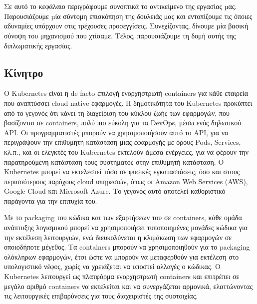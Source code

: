 \chapter{\grintroname} 
\label{chapter:gr-introduction}

Σε αυτό το κεφάλαιο περιγράφουμε συνοπτικά το αντικείμενο της εργασίας µας.
Παρουσιάζουμε µία σύντομη επισκόπηση της δουλειάς μας και εντοπίζουμε τις όποιες
αδυναμίες υπάρχουν στις τρέχουσες προσεγγίσεις. Συνεχίζοντας, δίνουμε µία βασική
σύνοψη του μηχανισμού που χτίσαμε. Τέλος, παρουσιάζουμε τη δομή αυτής της
διπλωματικής εργασίας.

\section{Κίνητρο} \label{section:gr-intro_motivation}

Ο Kubernetes είναι η de facto επιλογή ενορχηστρωτή containers για κάθε εταιρεία
που αναπτύσσει cloud native εφαρμογές. Η δημοτικότητα του Kubernetes προκύπτει
από το γεγονός ότι κάνει τη διαχείριση του κύκλου ζωής των εφαρμογών, που
βασίζονται σε containers, πολύ πιο εύκολη για τα DevOps, μέσω ενός δηλωτικού API.
Οι προγραμματιστές μπορούν να χρησιμοποιήσουν αυτό το API, για να περιγράψουν την
επιθυμητή κατάσταση μιας εφαρμογής με όρους Pods, Services, κλ.π., και οι
ελεγκτές του Kubernetes εκτελούν άμεσα ενέργειες, για να φέρουν την
παρατηρούμενη κατάσταση τους συστήματος στην επιθυμητή κατάσταση. Ο Kubernetes
μπορεί να εκτελεστεί τόσο σε φυσικές εγκαταστάσεις, όσο και στους περισσότερους παρόχους cloud
υπηρεσιών, όπως οι Amazon Web Services (AWS), Google Cloud και Microsoft Azure.
Το γεγονός αυτό αποτελεί καθοριστικό παράγοντα για την επιτυχία του.

Με το packaging του κώδικα και των εξαρτήσεων του σε containers, κάθε ομάδα
ανάπτυξης λογισμικού μπορεί να χρησιμοποιήσει τυποποιημένες μονάδες κώδικα για
την εκτέλεση λειτουργιών, ενώ διευκολύνεται η κλιμάκωση των εφαρμογών σε
οποιοδήποτε μέγεθος. Τα containers μπορούν να χρησιμοποιηθούν για το packaging
ολόκληρων εφαρμογών, έτσι ώστε να μπορούν να μεταφερθούν για εκτέλεση στο
υπολογιστικό νέφος, χωρίς να χρειάζεται να υποστεί αλλαγές ο κώδικας. Ο
Kubernetes λειτουργεί ως πλατφόρμα ενορχηστρωτή containers και επιτρέπει σε
μεγάλο αριθμό containers να εκτελείται και να συνεργάζεται αρμονικά,
ελαττώνοντας τις λειτουργικές επιβαρύνσεις για τους διαχειριστές της συστοιχίας.

